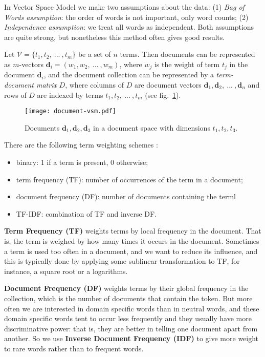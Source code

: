 In Vector Space Model we make two assumptions about the data:
(1) \emph{Bag of Words assumption}: the order of words is not important,
only word counts;
(2) \emph{Independence assumption}: we treat all words as independent.
Both assumptions are quite strong, but nonetheless this method often
gives good results.

Let $\mathcal V = \{t_1, t_2, \ ... \ , t_m \}$ be a set of $n$ terms.
Then documents can be represented as $m$-vectors
$\mathbf d_i = (w_1, w_2, \ ... \ , w_m)$, where $w_j$ is the weight
of term $t_j$ in the document $\mathbf d_i$,
and the document collection can be represented by a \emph{term-document matrix}
$D$, where columns of $D$ are document vectors
$\mathbf d_1, \mathbf d_2, \ ... \ , \mathbf d_n$
and rows of $D$ are indexed by terms $t_1, t_2, \ ... \ , t_m$
(see fig.~\ref{fig:document-vsm}).

\begin{figure}[h]
\centering\texttt{[image: document-vsm.pdf]}
\caption{Documents $\mathbf d_1, \mathbf d_2, \mathbf d_3$
in a document space with dimensions $t_1, t_2, t_3$.}
\label{fig:document-vsm}
\end{figure}


There are the following term weighting schemes \cite{manning2008introduction}:

\begin{itemize}
\itemsep1pt\parskip0pt
  \item binary: 1 if a term is present, 0 otherwise;
  \item term frequency (TF): number of occurrences of the term in a document;
  \item document frequency (DF): number of documents containing the terml
  \item TF-IDF: combination of TF and inverse DF.
\end{itemize}


\textbf{Term Frequency (TF)} weights terms by local frequency in the document.
That is, the term is weighed by how many times it occurs in the document.
Sometimes a term is used too often in a document, and we want to
reduce its influence, and this is typically done by applying some
sublinear transformation to TF, for instance, a square root or a logarithms.

\textbf{Document Frequency (DF)} weights terms by their global frequency
in the collection, which is the number of documents that contain the token.
But more often we are interested in domain specific words than in neutral words,
and these domain specific words tent to occur less frequently and they usually
have more discriminative power: that is, they are better in telling one document apart from another. So we use \textbf{Inverse Document Frequency (IDF)} to give more
weight to rare words rather than to frequent words.

